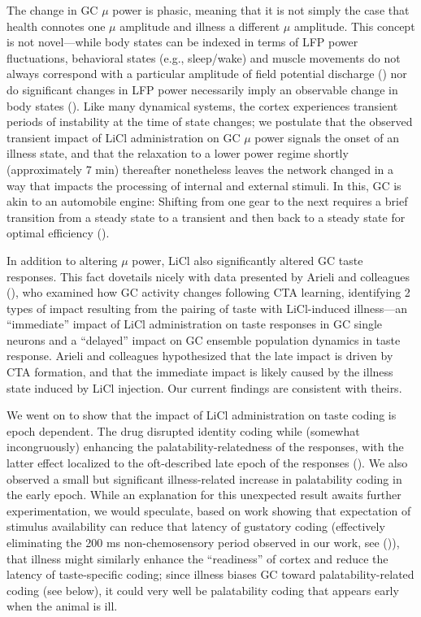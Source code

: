 \begin{refsection}
{The change in GC \(\mu\) power is phasic, meaning that it is not simply the case that health connotes one \(\mu\) amplitude and illness a different \(\mu\) amplitude. This concept is not novel—while body states can be indexed in terms of LFP power fluctuations, behavioral states (e.g., sleep/wake) and muscle movements do not always correspond with a particular amplitude of field potential discharge (\cite{aston-jones1981a}) nor do significant changes in LFP power necessarily imply an observable change in body states (\cite{rojas-l2014a}). Like many dynamical systems, the cortex experiences transient periods of instability at the time of state changes; we postulate that the observed transient impact of LiCl administration on GC \(\mu\) power signals the onset of an illness state, and that the relaxation to a lower power regime shortly (approximately 7 min) thereafter nonetheless leaves the network changed in a way that impacts the processing of internal and external stimuli. In this, GC is akin to an automobile engine: Shifting from one gear to the next requires a brief transition from a steady state to a transient and then back to a steady state for optimal efficiency (\cite{oglieve2017a,horn2006a}).

In addition to altering \(\mu\) power, LiCl also significantly altered GC taste responses. This fact dovetails nicely with data presented by Arieli and colleagues (\cite{arieli2022a}), who examined how GC activity changes following CTA learning, identifying 2 types of impact resulting from the pairing of taste with LiCl-induced illness—an “immediate” impact of LiCl administration on taste responses in GC single neurons and a “delayed” impact on GC ensemble population dynamics in taste response. Arieli and colleagues hypothesized that the late impact is driven by CTA formation, and that the immediate impact is likely caused by the illness state induced by LiCl injection. Our current findings are consistent with theirs.

We went on to show that the impact of LiCl administration on taste coding is epoch dependent. The drug disrupted identity coding while (somewhat incongruously) enhancing the palatability-relatedness of the responses, with the latter effect localized to the oft-described late epoch of the responses (\cite{katz-a,katz2001a,sadacca2016a}). We also observed a small but significant illness-related increase in palatability coding in the early epoch. While an explanation for this unexpected result awaits further experimentation, we would speculate, based on work showing that expectation of stimulus availability can reduce that latency of gustatory coding (effectively eliminating the 200 ms non-chemosensory period observed in our work, see (\cite{samuelsen2012a,gutierrez2010a,stapleton2006a,graham2014a,bouaichi2020a,dikecligil2020a})), that illness might similarly enhance the “readiness” of cortex and reduce the latency of taste-specific coding; since illness biases GC toward palatability-related coding (see below), it could very well be palatability coding that appears early when the animal is ill.

}
\end{refsection}
